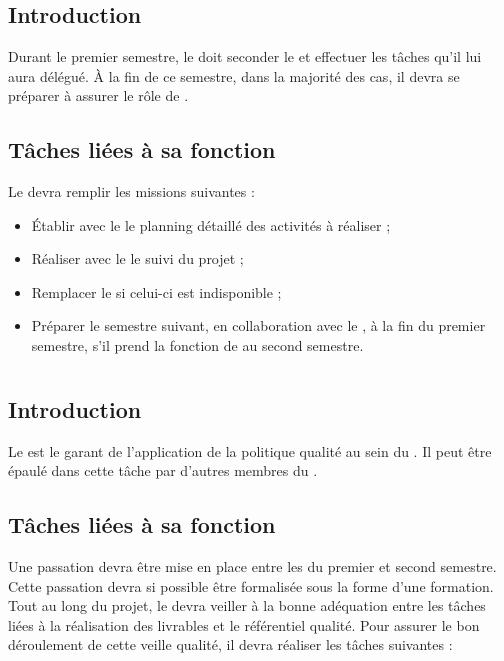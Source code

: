 \section{\CPA}
\subsection*{Introduction}

Durant le premier semestre, le \CPA{} doit seconder le \CP{} et effectuer les tâches qu’il lui aura délégué. À la fin de ce semestre, dans la majorité des cas, il devra se préparer à assurer le rôle de \CP.

\subsection*{Tâches liées à sa fonction}

Le \CPA{} devra remplir les missions suivantes :
\begin{itemize}
	\item Établir avec le \CP{} le planning détaillé des activités à réaliser ;
	\item Réaliser avec le \CP{} le suivi du projet ;
	\item Remplacer le \CP{} si celui-ci est indisponible ;
	\item Préparer le semestre suivant, en collaboration avec le \CP, à la fin du premier semestre, s’il prend la fonction de \CP{} au second semestre.
\end{itemize}

\newpage
\section{\RQ}
\subsection*{Introduction}

Le \RQ{} est le garant de l’application de la politique qualité au sein du \PICCourt. Il peut être épaulé dans cette tâche par d’autres membres du \PICCourt.

\subsection*{Tâches liées à sa fonction}

Une passation devra être mise en place entre les \RQs{} du premier et second semestre. Cette passation devra si possible être formalisée sous la forme d’une formation.\\
Tout au long du projet, le \RQ{} devra veiller à la bonne adéquation entre les tâches liées à la réalisation des livrables et le référentiel qualité. Pour assurer le bon déroulement de cette veille qualité, il devra réaliser les tâches suivantes :

